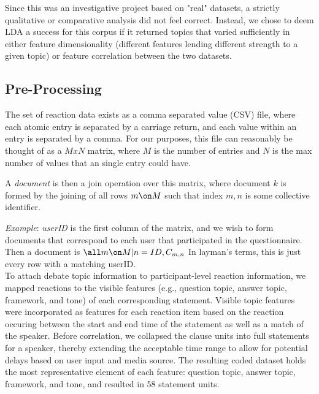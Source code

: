 Since this was an investigative project based on "real" datasets, a strictly qualitative or comparative analysis did not feel correct. Instead, we chose to deem LDA a success for this corpus if it returned topics that varied sufficiently in either feature dimensionality (different features lending different strength to a given topic) or feature correlation between the two datasets.

\subsection{Pre-Processing}
The set of reaction data exists as a comma separated value (CSV) file, where each atomic entry is separated by a carriage return, and each value within an entry is separated by a comma. For our purposes, this file can reasonably be thought of as a $MxN$ matrix, where $M$ is the number of entries and $N$ is the max number of values that an single entry could have.

A \emph{document} is then a join operation over this matrix, where document $k$ is formed by the joining of all rows $m \on M$ such that index $m,n$ is some collective identifier.

\emph{Example}: \emph{userID} is the first column of the matrix, and we wish to form documents that correspond to each user that participated in the questionnaire. Then a document is $\all m \on M | n = ID ,C_{m,n}$ In layman's terms, this is just every row with a matching userID.\\

To attach debate topic information to participant-level reaction information, we mapped reactions to the visible features (e.g., question topic, answer topic, framework, and tone) of each corresponding statement.  Visible topic features were incorporated as features for each reaction item based on the reaction occuring between the start and end time of the statement as well as a match of the speaker.   Before correlation,  we collapsed the clause units into full statements for a speaker, thereby extending the acceptable time range to allow for potential delays based on user input and media source.  The resulting coded dataset holds the most representative element of each feature: question topic, answer topic, framework, and tone, and resulted in 58 statement units.
